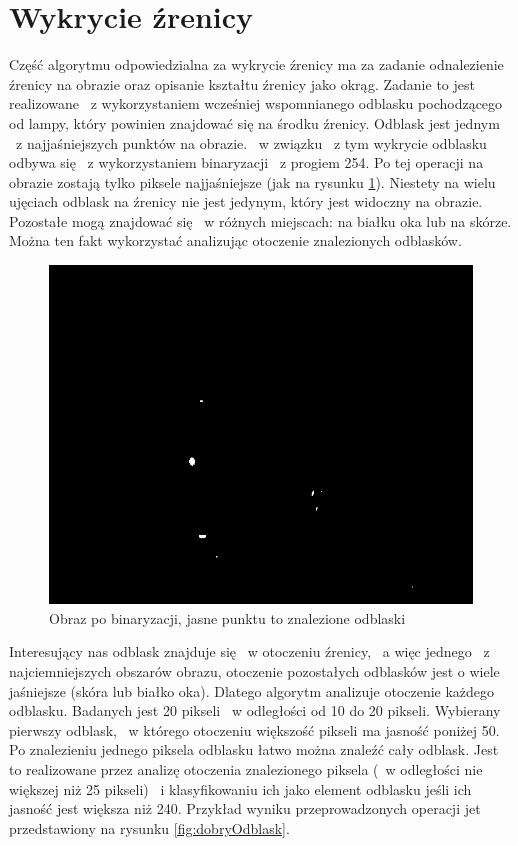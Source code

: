 \section{Wykrycie źrenicy}
\label{sec:wykrycieZrenicy}
Część algorytmu odpowiedzialna za wykrycie źrenicy ma za zadanie odnalezienie źrenicy na obrazie oraz opisanie kształtu źrenicy jako okrąg. Zadanie to jest realizowane ~z wykorzystaniem wcześniej wspomnianego odblasku pochodzącego od lampy, który powinien znajdować się na środku źrenicy. Odblask jest jednym ~z najjaśniejszych punktów na obrazie. ~w związku ~z tym wykrycie odblasku odbywa się ~z wykorzystaniem binaryzacji ~z progiem 254. Po tej operacji na obrazie zostają tylko piksele najjaśniejsze (jak na rysunku \ref{fig:binaryzacja}). Niestety na wielu ujęciach odblask na źrenicy nie jest jedynym, który jest widoczny na obrazie. Pozostałe mogą znajdować się ~w różnych miejscach: na białku oka lub na skórze. Można ten fakt wykorzystać analizując otoczenie znalezionych odblasków. 

\begin{figure}
\label{fig:binaryzacja}
\begin{center}
\includegraphics[scale=0.5]{binaryzacja.jpg}
\caption{Obraz po binaryzacji, jasne punktu to znalezione odblaski}
\end{center}
\end{figure}

Interesujący nas odblask znajduje się ~w otoczeniu źrenicy, ~a więc jednego ~z najciemniejszych obszarów obrazu, otoczenie pozostałych odblasków jest o wiele jaśniejsze (skóra lub białko oka). Dlatego algorytm analizuje otoczenie każdego odblasku. Badanych jest 20 pikseli ~w odległości od 10 do 20 pikseli. Wybierany pierwszy odblask, ~w którego otoczeniu większość pikseli ma jasność poniżej 50. Po znalezieniu jednego piksela odblasku łatwo można znaleźć cały odblask. Jest to realizowane przez analizę otoczenia znalezionego piksela (~w odległości nie większej niż 25 pikseli) ~i klasyfikowaniu ich jako element odblasku jeśli ich jasność jest większa niż 240. Przykład wyniku przeprowadzonych operacji jet przedstawiony na rysunku \ref{fig:dobryOdblask}.

